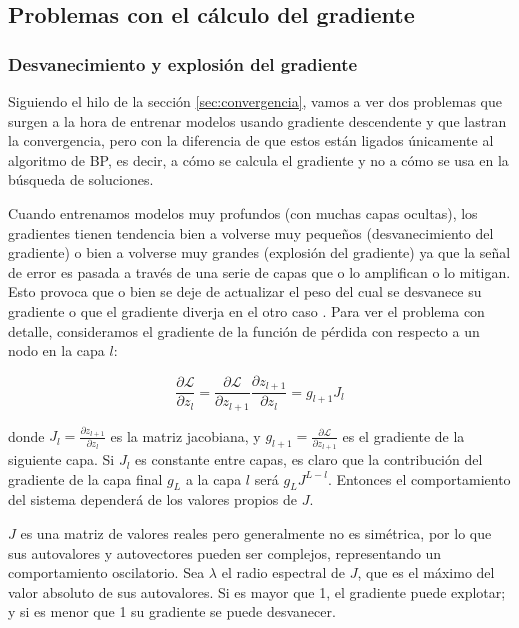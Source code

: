 \subsection{Problemas con el cálculo del gradiente}

\subsubsection{Desvanecimiento y explosión del gradiente}


Siguiendo el hilo de la sección \ref{sec:convergencia}, vamos a ver dos problemas que surgen a la hora de entrenar modelos usando gradiente descendente y que lastran la convergencia, pero con la diferencia de que estos están ligados únicamente al algoritmo de BP, es decir, a cómo se calcula el gradiente y no a cómo se usa en la búsqueda de soluciones.

Cuando entrenamos modelos muy profundos (con muchas capas ocultas), los gradientes tienen tendencia bien a volverse muy pequeños (desvanecimiento del gradiente) o bien a volverse muy grandes (explosión del gradiente) ya que la señal de error es pasada a través de una serie de capas que o lo amplifican o lo mitigan. Esto provoca que o bien se deje de actualizar el peso del cual se desvanece su gradiente o que el gradiente diverja en el otro caso \cite{VanishExplode}. Para ver el problema con detalle, consideramos el gradiente de la función de pérdida con respecto a un nodo en la capa $l$:

$$\frac{\partial \mathcal{L}}{\partial z_l} = \frac{\partial \mathcal{L}}{\partial z_{l+1}} \frac{\partial z_{l+1}}{\partial z_l} = g_{l+1} J_l$$

donde $J_l = \frac{\partial z_{l+1}}{\partial z_l}$ es la matriz jacobiana, y $g_{l+1} = \frac{\partial \mathcal{L}}{\partial z_{l+1}}$ es el gradiente de la siguiente capa. Si $J_l$ es constante entre capas, es claro que la contribución del gradiente de la capa final $g_L$ a la capa $l$ será $ g_L J^{L-l}$. Entonces el comportamiento del sistema dependerá de los valores propios de $J$. %

$J$ es una matriz de valores reales pero generalmente no es simétrica, por lo que sus autovalores y autovectores pueden ser complejos, representando un comportamiento oscilatorio. Sea $\lambda$ el radio espectral de $J$, que es el máximo del valor absoluto de sus autovalores. Si es mayor que 1, el gradiente puede explotar; y si es menor que 1 su gradiente se puede desvanecer. 

